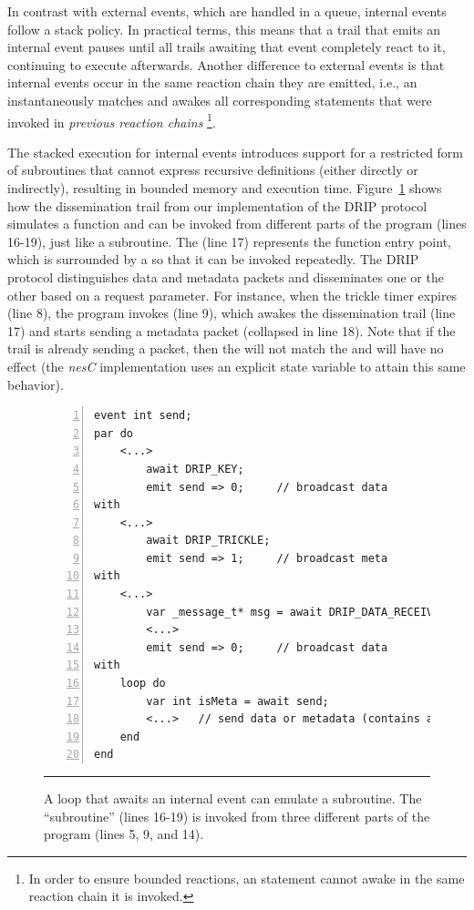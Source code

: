 In contrast with external events, which are handled in a queue, internal events 
follow a stack policy.
In practical terms, this means that a trail that emits an internal event pauses 
until all trails awaiting that event completely react to it, continuing to 
execute afterwards.
%
Another difference to external events is that internal events occur in the same 
reaction chain they are emitted, i.e., an  instantaneously matches 
and awakes all corresponding  statements that were invoked in 
\emph{previous reaction chains}%
\footnote{In order to ensure bounded reactions, an  statement 
cannot awake in the same reaction chain it is invoked.}.

The stacked execution for internal events introduces support for a restricted 
form of subroutines that cannot express recursive definitions (either directly 
or indirectly), resulting in bounded memory and execution time.
%
Figure~\ref{lst.func} shows how the dissemination trail from our implementation 
of the DRIP protocol simulates a function and can be invoked from different 
parts of the program (lines 16-19), just like a subroutine.
The  (line 17) represents the function entry point, which is 
surrounded by a  so that it can be invoked repeatedly.
The DRIP protocol distinguishes data and metadata packets and disseminates one 
or the other based on a request parameter.
For instance, when the trickle timer expires (line 8), the program invokes 
 (line 9), which awakes the dissemination trail (line 17) 
and starts sending a metadata packet (collapsed in line 18).
Note that if the trail is already sending a packet, then the  will 
not match the  and will have no effect (the \emph{nesC} 
implementation uses an explicit state variable to attain this same behavior).


\begin{figure}[t]
\begin{lstlisting}[numbers=left,xleftmargin=2em]
event int send;
par do
    <...>
        await DRIP_KEY;
        emit send => 0;     // broadcast data
with
    <...>
        await DRIP_TRICKLE;
        emit send => 1;     // broadcast meta
with
    <...>
        var _message_t* msg = await DRIP_DATA_RECEIVE;
        <...>
        emit send => 0;     // broadcast data
with
    loop do
        var int isMeta = await send;
        <...>   // send data or metadata (contains awaits)
    end
end
\end{lstlisting}
\rule{14cm}{0.37pt}
\caption{ A loop that awaits an internal event can emulate a subroutine.  \newline
{\small %
The  ``subroutine'' (lines 16-19) is invoked from three different 
parts of the program (lines 5, 9, and 14).
}%
\label{lst.func}
}
\end{figure}

